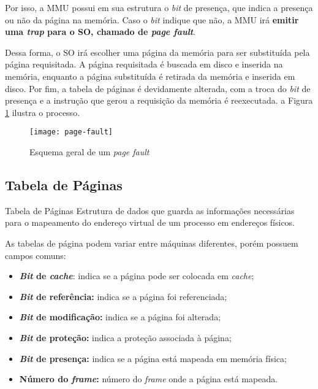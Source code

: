 Por isso, a MMU possui em sua estrutura o \textit{bit} de presença, que indica a presença ou não da página na memória. Caso o \textit{bit} indique que não, a MMU irá \textbf{emitir uma \textit{trap} para o SO, chamado de \textit{page fault}}.

Dessa forma, o SO irá escolher uma página da memória para ser substituída pela página requisitada. A página requisitada é buscada em disco e inserida na memória, enquanto a página substituída é retirada da memória e inserida em disco. Por fim, a tabela de páginas é devidamente alterada, com a troca do \textit{bit} de presença e a instrução que gerou a requisição da memória é reexecutada. a Figura \ref{fig:page-fault} ilustra o processo.

\begin{figure}
  \centering
  \texttt{[image: page-fault]}
  \caption{Esquema geral de um \textit{page fault}}
  \label{fig:page-fault}
\end{figure}











\subsection{Tabela de Páginas}
\begin{definicao}{Tabela de Páginas}
  Estrutura de dados que guarda as informações necessárias para o mapeamento do endereço virtual de um processo em endereços físicos.
\end{definicao}

As tabelas de página podem variar entre máquinas diferentes, porém possuem campos comuns:
\begin{itemize}
  \item \textbf{\textit{Bit} de \textit{cache}}: indica se a página pode ser colocada em \textit{cache};

  \item \textbf{\textit{Bit} de referência:} indica se a página foi referenciada;

  \item \textbf{\textit{Bit} de modificação:} indica se a página foi alterada;

  \item \textbf{\textit{Bit} de proteção:} indica a proteção associada à página;

  \item \textbf{\textit{Bit} de presença:} indica se a página está mapeada em memória física;

  \item \textbf{Número do \textit{frame}:} número do \textit{frame} onde a página está mapeada.
\end{itemize}

